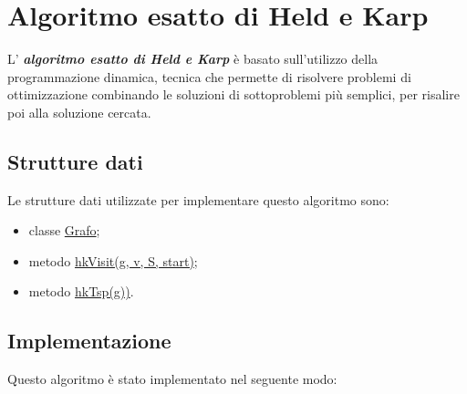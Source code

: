\section{Algoritmo esatto di Held e Karp}
\label{algoritmoEsatto}

L' \textbf{\textit{algoritmo esatto di Held e Karp}} è basato sull'utilizzo della programmazione dinamica, tecnica che permette di risolvere problemi di ottimizzazione combinando le soluzioni di sottoproblemi più semplici, per risalire poi alla soluzione cercata.

\subsection{Strutture dati}
\label{struttureDati1}

Le strutture dati utilizzate per implementare questo algoritmo sono:

\begin{itemize}
    \item classe \hyperlink{subsection.2.1}{Grafo};
    \item metodo \hyperlink{hkvisit}{hkVisit(g, v, S, start)};
    \item metodo \hyperlink{hktsp}{hkTsp(g))}.
\end{itemize}

\subsection{Implementazione}
\label{implementazione1}

Questo algoritmo è stato implementato nel seguente modo:

